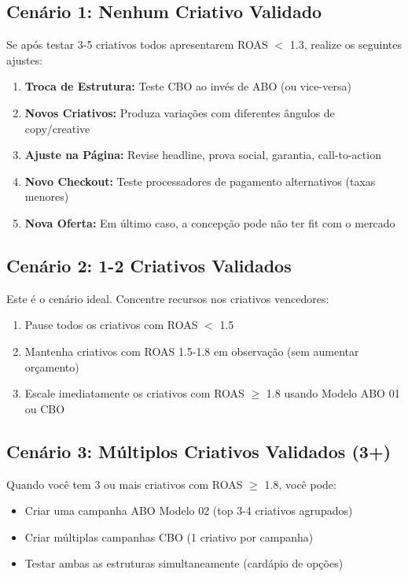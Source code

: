 \documentclass[12pt, a4paper]{article}
\begin{document}
\subsection{Cenário 1: Nenhum Criativo Validado}

Se após testar 3-5 criativos todos apresentarem ROAS $<$ 1.3, realize os seguintes ajustes:

\begin{enumerate}
    \item \textbf{Troca de Estrutura:} Teste CBO ao invés de ABO (ou vice-versa)
    \item \textbf{Novos Criativos:} Produza variações com diferentes ângulos de copy/creative
    \item \textbf{Ajuste na Página:} Revise headline, prova social, garantia, call-to-action
    \item \textbf{Novo Checkout:} Teste processadores de pagamento alternativos (taxas menores)
    \item \textbf{Nova Oferta:} Em último caso, a concepção pode não ter fit com o mercado
\end{enumerate}

\subsection{Cenário 2: 1-2 Criativos Validados}

Este é o cenário ideal. Concentre recursos nos criativos vencedores:

\begin{enumerate}
    \item Pause todos os criativos com ROAS $<$ 1.5
    \item Mantenha criativos com ROAS 1.5-1.8 em observação (sem aumentar orçamento)
    \item Escale imediatamente os criativos com ROAS $\geq$ 1.8 usando Modelo ABO 01 ou CBO
\end{enumerate}

\subsection{Cenário 3: Múltiplos Criativos Validados (3+)}

Quando você tem 3 ou mais criativos com ROAS $\geq$ 1.8, você pode:

\begin{itemize}
    \item Criar uma campanha ABO Modelo 02 (top 3-4 criativos agrupados)
    \item Criar múltiplas campanhas CBO (1 criativo por campanha)
    \item Testar ambas as estruturas simultaneamente (cardápio de opções)
\end{itemize}
\end{document}
